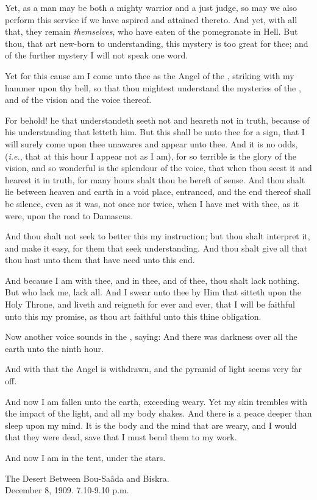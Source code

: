 Yet, as a man may be both a mighty warrior and a just judge, so may we also perform this service if we have aspired and attained thereto. And yet, with all that, they remain \textit{themselves}, who have eaten of the pomegranate in Hell. But thou, that art new-born to understanding, this mystery is too great for thee; and of the further mystery I will not speak one word.

Yet for this cause am I come unto thee as the Angel of the \AEthyr, striking with my hammer upon thy bell, so that thou mightest understand the mysteries of the \AEthyr, and of the vision and the voice thereof.

For behold! he that understandeth seeth not and heareth not in truth, because of his understanding that letteth him. But this shall be unto thee for a sign, that I will surely come upon thee unawares and appear unto thee. And it is no odds, (\textit{i.e.}, that at this hour I appear not as I am), for so terrible is the glory of the vision, and so wonderful is the splendour of the voice, that when thou seest it and hearest it in truth, for many hours shalt thou be bereft of sense. And thou shalt lie between heaven and earth in a void place, entranced, and the end thereof shall be silence, even as it was, not once nor twice, when I have met with thee, as it were, upon the road to Damascus.

And thou shalt not seek to better this my instruction; but thou shalt interpret it, and make it easy, for them that seek understanding. And thou shalt give all that thou hast unto them that have need unto this end.

And because I am with thee, and in thee, and of thee, thou shalt lack nothing. But who lack me, lack all. And I swear unto thee by Him that sitteth upon the Holy Throne, and liveth and reigneth for ever and ever, that I will be faithful unto this my promise, as thou art faithful unto this thine obligation.

Now another voice sounds in the \AEthyr, saying: And there was darkness over all the earth unto the ninth hour.

And with that the Angel is withdrawn, and the pyramid of light seems very far off.

And now I am fallen unto the earth, exceeding weary. Yet my skin trembles with the impact of the light, and all my body shakes. And there is a peace deeper than sleep upon my mind. It is the body and the mind that are weary, and I would that they were dead, save that I must bend them to my work.

And now I am in the tent, under the stars.


\begin{quoting}
\centering
The Desert Between Bou-Sa\^{a}da and Biskra. \\
December 8, 1909. 7.10-9.10 p.m.
\end{quoting}
\index{\AEthyr{}|)}
